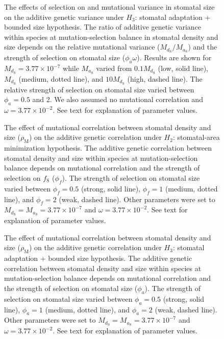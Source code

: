 \documentclass[
  letterpaper,
  DIV=11,
  numbers=noendperiod]{scrartcl}
\begin{document}
\begin{figure}
\caption{The effects of selection on and mutational variance in stomatal size on the additive genetic variance under $H_3$: stomatal adaptation + bounded size hypothesis. The ratio of additive genetic variance within species at mutation-selection balance in stomatal density and size depends on the relative mutational variance ($M_{d_\mathrm{S}} / M_{a_\mathrm{S}}$) and the strength of selection on stomatal size ($\phi_a \omega$). Results are shown for $M_{d_\mathrm{S}} = 3.77 \times 10^{-7}$ while $M_{a_\mathrm{S}}$ varied from $0.1 M_{d_\mathrm{S}}$ (low, solid line), $M_{d_\mathrm{S}}$ (medium, dotted line), and $10 M_{d_\mathrm{S}}$ (high, dashed line). The relative strength of selection on stomatal size varied between $\phi_a = 0.5$ and 2. We also assumed no mutational correlation and $\omega = 3.77 \times 10^{-2}$. See text for explanation of parameter values.}

\end{figure}

\newpage

\begin{figure}
\caption{The effect of mutational correlation between stomatal density and size ($\rho_\mathrm{M}$) on the additive genetic correlation under $H_2$: stomatal-area minimization hypothesis. The additive genetic correlation between stomatal density and size within species at mutation-selection balance depends on mutational correlation and the strength of selection on $f_\mathrm{S}$ ($\phi_f$). The strength of selection on stomatal size varied between $\phi_f = 0.5$ (strong, solid line), $\phi_f = 1$ (medium, dotted line), and $\phi_f = 2$ (weak, dashed line). Other parameters were set to $M_{d_\mathrm{S}} = M_{a_\mathrm{S}} = 3.77 \times 10^{-7}$ and $\omega = 3.77 \times 10^{-2}$. See text for explanation of parameter values.}

\end{figure}

\newpage

\begin{figure}
\caption{The effect of mutational correlation between stomatal density and size ($\rho_\mathrm{M}$) on the additive genetic correlation under $H_3$: stomatal adaptation + bounded size hypothesis. The additive genetic correlation between stomatal density and size within species at mutation-selection balance depends on mutational correlation and the strength of selection on stomatal size ($\phi_a$). The strength of selection on stomatal size varied between $\phi_a = 0.5$ (strong, solid line), $\phi_a = 1$ (medium, dotted line), and $\phi_a = 2$ (weak, dashed line). Other parameters were set to $M_{d_\mathrm{S}} = M_{a_\mathrm{S}} = 3.77 \times 10^{-7}$ and $\omega = 3.77 \times 10^{-2}$. See text for explanation of parameter values.}

\end{figure}
\end{document}
